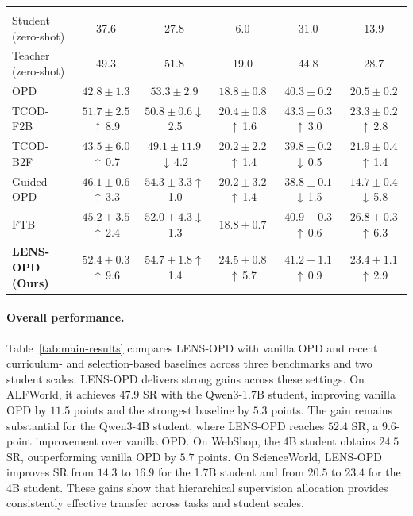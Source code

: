 \documentclass{article}
\newcommand{\gain}[1]{\textcolor{gainGreen}{\scriptsize$\uparrow$\,#1}}
\newcommand{\loss}[1]{\textcolor{lossRed}{\scriptsize$\downarrow$\,#1}}
\begin{document}
\begin{table}[t]
{\begin{tabular}{lccccc}
    \midrule
    \rowcolor{groupGray}
    \multicolumn{6}{c}{\textbf{Qwen3-32B teacher $\rightarrow$ Qwen3-4B student}} \\
    Student (zero-shot)       & 37.6         & 27.8          & 6.0          & 31.0          & 13.9 \\
    Teacher (zero-shot)       & 49.3         & 51.8          & 19.0          & 44.8          & 28.7 \\
    OPD                       & $42.8\pm1.3$ & $53.3\pm2.9$ & $18.8\pm0.8$ & $40.3\pm0.2$ & $20.5\pm0.2$ \\
    TCOD-F2B                  & \cellcolor{secondSand}$51.7\pm2.5$\gain{8.9}  & $50.8\pm0.6$\loss{2.5}  & \cellcolor{secondSand}$20.4\pm0.8$\gain{1.6}  & \cellcolor{bestLavender}$\mathbf{43.3\pm0.3}$\gain{3.0} & $23.3\pm0.2$\gain{2.8} \\
    TCOD-B2F                  & $43.5\pm6.0$\gain{0.7}  & $49.1\pm11.9$\loss{4.2} & $20.2\pm2.2$\gain{1.4} & $39.8\pm0.2$\loss{0.5} & $21.9\pm0.4$\gain{1.4} \\
    Guided-OPD                & $46.1\pm0.6$\gain{3.3}  & \cellcolor{secondSand}$54.3\pm3.3$\gain{1.0}  & $20.2\pm3.2$\gain{1.4}  & $38.8\pm0.1$\loss{1.5} & $14.7\pm0.4$\loss{5.8} \\
    FTB                       & $45.2\pm3.5$\gain{2.4} & $52.0\pm4.3$\loss{1.3} & $18.8\pm0.7$ & $40.9\pm0.3$\gain{0.6} & \cellcolor{bestLavender}$\mathbf{26.8\pm0.3}$\gain{6.3} \\
    \textbf{LENS-OPD (Ours)} & \cellcolor{bestLavender}$\mathbf{52.4\pm0.3}$\gain{9.6}  & \cellcolor{bestLavender}$\mathbf{54.7\pm1.8}$\gain{1.4}  & \cellcolor{bestLavender}$\mathbf{24.5\pm0.8}$\gain{5.7}  & \cellcolor{secondSand}$41.2\pm1.1$\gain{0.9}  & \cellcolor{secondSand}$23.4\pm1.1$\gain{2.9} \\
    \bottomrule
  \end{tabular}%
  }
\end{table}

\paragraph{Overall performance.}
Table~\ref{tab:main-results} compares LENS-OPD with vanilla OPD and recent curriculum- and
selection-based baselines across three benchmarks and two student scales.  LENS-OPD delivers
strong gains across these settings.  On ALFWorld, it achieves
$47.9$ SR with the Qwen3-1.7B student, improving vanilla OPD by $11.5$ points and the strongest
baseline by $5.3$ points.  The gain remains substantial for the Qwen3-4B student, where LENS-OPD
reaches $52.4$ SR, a $9.6$-point improvement over vanilla OPD.  On WebShop, the 4B student obtains
$24.5$ SR, outperforming vanilla OPD by $5.7$ points.  On ScienceWorld, LENS-OPD improves SR from
$14.3$ to $16.9$ for the 1.7B student and from $20.5$ to $23.4$ for the 4B student.  These gains
show that hierarchical supervision allocation provides consistently effective transfer across
tasks and student scales.
\end{document}
